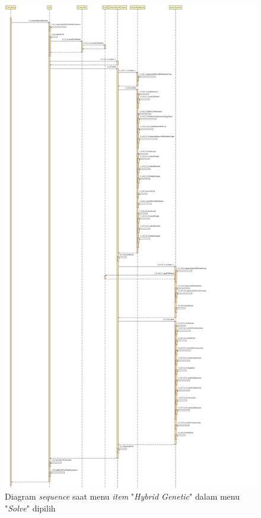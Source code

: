 \begin{figure}
\centering
\captionsetup{justification=centering}
\includegraphics[scale=0.2]{Gambar/Analisis/SequenceDiagramHybridGenetic.png}
\caption[Diagram \textit{sequence} saat menu \textit{item} "\textit{Hybrid Genetic}" dalam menu "\textit{Solve}" dipilih]{Diagram \textit{sequence} saat menu \textit{item} "\textit{Hybrid Genetic}" dalam menu "\textit{Solve}" dipilih}
\label{fig:sequencehg}
\end{figure}

